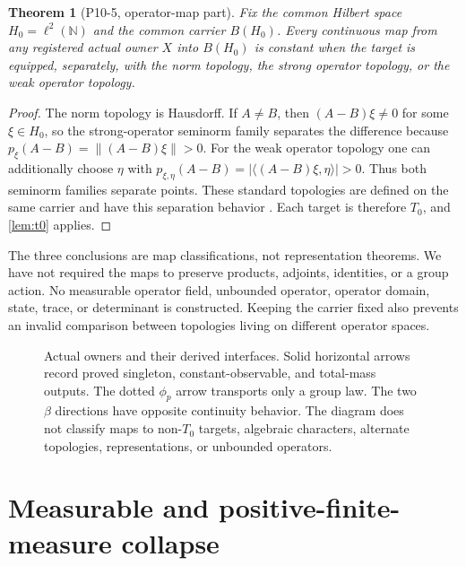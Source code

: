 \documentclass[11pt]{article}
\newtheorem{theorem}{Theorem}[section]
\theoremstyle{definition}
\newcommand{\N}{\mathbb N}
\begin{document}
\begin{theorem}[P10-5, operator-map part]
\label{thm:operator}
Fix the common Hilbert space $H_0=\ell^2(\N)$ and the common carrier $B(H_0)$.  Every continuous map from any registered actual owner $X$ into $B(H_0)$ is constant when the target is equipped, separately, with the norm topology, the strong operator topology, or the weak operator topology.
\end{theorem}

\begin{proof}
The norm topology is Hausdorff.  If $A\ne B$, then $(A-B)\xi\ne0$ for some $\xi\in H_0$, so the strong-operator seminorm family separates the difference because $p_\xi(A-B)=\lVert(A-B)\xi\rVert>0$.  For the weak operator topology one can additionally choose $\eta$ with $p_{\xi,\eta}(A-B)=|\langle(A-B)\xi,\eta\rangle|>0$.  Thus both seminorm families separate points.  These standard topologies are defined on the same carrier and have this separation behavior \cite[Section~4.1, physical p.~43 / printed p.~39]{HoermannCStar2026}.  Each target is therefore $T_0$, and \cref{lem:t0} applies.
\end{proof}

The three conclusions are map classifications, not representation theorems.  We have not required the maps to preserve products, adjoints, identities, or a group action.  No measurable operator field, unbounded operator, operator domain, state, trace, or determinant is constructed.  Keeping the carrier fixed also prevents an invalid comparison between topologies living on different operator spaces.

\begin{figure}[htbp]
\centering
\resizebox{0.98\textwidth}{!}{}
\caption{Actual owners and their derived interfaces.  Solid horizontal arrows record proved singleton, constant-observable, and total-mass outputs.  The dotted $\phi_p$ arrow transports only a group law.  The two $\beta$ directions have opposite continuity behavior.  The diagram does not classify maps to non-$T_0$ targets, algebraic characters, alternate topologies, representations, or unbounded operators.}
\label{fig:owners}
\end{figure}

\section{Measurable and positive-finite-measure collapse}
\label{sec:measure}
\end{document}
